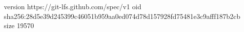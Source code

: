 version https://git-lfs.github.com/spec/v1
oid sha256:28d5e39d245399c46051b959aa0ed074d78d157928fd75481e3c9afff187b2cb
size 19570

